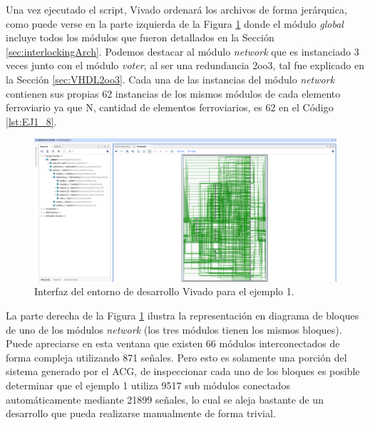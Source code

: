 	Una vez ejecutado el script, Vivado ordenará los archivos de forma jerárquica, como puede verse en la parte izquierda de la Figura \ref{fig:EJ1_ACG_Vivado} donde el módulo \textit{global} incluye todos los módulos que fueron detallados en la Sección \ref{sec:interlockingArch}. Podemos destacar al módulo \textit{network} que es instanciado 3 veces junto con el módulo \textit{voter}, al ser una redundancia 2oo3, tal fue explicado en la Sección \ref{sec:VHDL2oo3}. Cada una de las instancias del módulo \textit{network} contienen sus propias 62 instancias de los mismos módulos de cada elemento ferroviario ya que N, cantidad de elementos ferroviarios, es 62 en el Código \ref{lst:EJ1_8}.	
	
	\begin{figure}[H]
		\centering
		\includegraphics[origin = c, width=1\textwidth]{resultados-obtenidos/ejemplo1/images/ACG_vivado}
		\centering\caption{Interfaz del entorno de desarrollo Vivado para el ejemplo 1.}
		\label{fig:EJ1_ACG_Vivado}
	\end{figure}
	
	La parte derecha de la Figura \ref{fig:EJ1_ACG_Vivado} ilustra la representación en diagrama de bloques de uno de los módulos \textit{network} (los tres módulos tienen los mismos bloques). Puede apreciarse en esta ventana que existen 66 módulos interconectados de forma compleja utilizando 871 señales. Pero esto es solamente una porción del sistema generado por el ACG, de inspeccionar cada uno de los bloques es posible determinar que el ejemplo 1 utiliza 9517 sub módulos conectados automáticamente mediante 21899 señales, lo cual se aleja bastante de un desarrollo que pueda realizarse manualmente de forma trivial.
	
